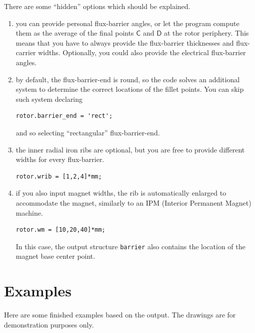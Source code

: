 \documentclass[b5paper,11pt,oneside,fleqn]{article}
\newcommand{\pt}[1]{\mathsf{#1}}
\begin{document}
There are some ``hidden'' options which should be explained.
\begin{enumerate}
\item you can provide personal flux-barrier angles, or let the program compute 
them as the average of the final points $ \pt{C} $ and $ \pt{D} $ at the rotor 
periphery.
This means that you have to always provide the flux-barrier thicknesses and 
flux-carrier widths.
Optionally, you could also provide the electrical flux-barrier angles.

\item by default, the flux-barrier-end is round, so the code solves an 
additional system to determine the correct locations of the fillet points.
You can skip such system declaring 
\begin{lstlisting}[style=Matlab]
rotor.barrier_end = 'rect';
\end{lstlisting}
and so selecting ``rectangular'' flux-barrier-end.

\item the inner radial iron ribs are optional, but you are free to provide 
different widths for every flux-barrier.
\begin{lstlisting}[style=Matlab]
rotor.wrib = [1,2,4]*mm;
\end{lstlisting}

\item if you also input magnet widths, the rib is automatically enlarged to 
accommodate the magnet, similarly to an IPM (Interior Permanent Magnet) machine.
\begin{lstlisting}[style=Matlab]
rotor.wm = [10,20,40]*mm;
\end{lstlisting}
In this case, the output structure \texttt{barrier} also contains the location 
of the magnet base center point.

\end{enumerate}



\clearpage
\section{Examples}
Here are some finished examples based on the output.
The drawings are for demonstration purposes only.

\vspace{\baselineskip}
\end{document}
